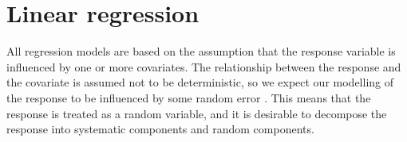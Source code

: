 
\section{Linear regression}
\label{sec:linreg}
All regression models are based on the assumption that the response variable is influenced by one or more covariates.
The relationship between the response and the covariate is assumed not to be deterministic, so we expect our modelling of the response to be influenced by some random error \citep{GLMM_book}.
This means that the response is treated as a random variable, and it is desirable to decompose the response into systematic components and random components.
